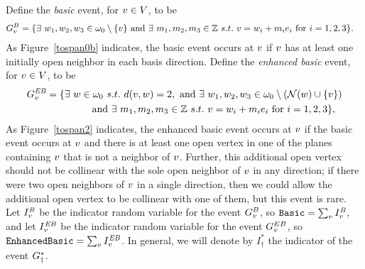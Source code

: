 Define the {\em basic} event, for ${ v} \in V$, to be
\begin{align*}
G^B_{{ v}} &= \{ \exists \ { w_1}, { w_2}, { w_3} \in \omega_0 \setminus \{{ v}\} \text{ and }\exists\ m_1, m_2, m_3 \in \mathbb{Z} \ s.t. \ { v} = { w_i} + m_i { e_i} \text{ for } i=1,2,3 \}.
\end{align*}
As Figure~\ref{tospan0b} indicates, the basic event occurs at ${ v}$ if ${ v}$ has at least one initially open neighbor in each basis direction.  Define the {\em enhanced basic} event, for ${ v} \in V$, to be
\begin{align*}
\event^{\text{\em EB}}_{\vect{v}} &=   \{\exists \ \vect{w} \in \omega_0 \ s.t. \ d(\vect{v}, \vect{w}) = 2, \text{ and }  \exists \ \vect{w_1}, \vect{w_2}, \vect{w_3} \in \omega_0 \setminus (\mathcal{N}(w)\cup\{\vect{v}\}) \\
& \hspace{1.5cm} \text{ and }\exists\ m_1, m_2, m_3 \in \mathbb{Z} \ s.t. \ \vect{v} = \vect{w_i} + m_i \vect{e_i} \text{ for } i=1,2,3\},
\end{align*}
As Figure~\ref{tospan2} indicates, the enhanced basic event occurs at ${ v}$ if the basic event occurs at ${ v}$ and there is at least one open vertex in one of the planes containing ${ v}$ that is not a neighbor of ${ v}$.  Further, this additional open vertex should not be collinear with the sole open neighbor of ${ v}$ in any direction; if there were two open neighbors of ${ v}$ in a single direction, then we could allow the additional open vertex to be collinear with one of them, but this event is rare.  Let $I^{\text{\em B}}_{{ v}}$ be the indicator random variable for the event $G^B_{{ v}}$, so $\operatorname{\tt Basic} = \sum_{ v} I^{\text{\em B}}_{{ v}}$,  and let $I^{\text{\em EB}}_{{ v}}$ be the indicator random variable for the event $G^{EB}_{ v}$, so $\operatorname{\tt Enhanced Basic} = \sum_{{ v}} I^{\text{\em EB}}_{{ v}}$.   In general, we will denote by $I_\dagger^*$ the indicator of the event $G_\dagger^*$.

